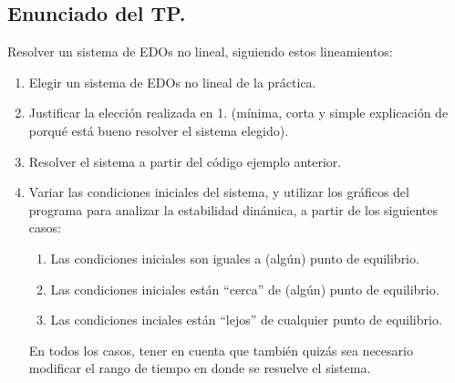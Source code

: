 \documentclass[a4paper,11pt,landscape,twocolumn]{article}
\begin{document}
\subsection*{Enunciado del TP.}
Resolver un sistema de EDOs no lineal, siguiendo estos lineamientos:
	\begin{enumerate}
		\item Elegir un sistema de EDOs no lineal de la práctica.
		\item Justificar la elección realizada en 1. (mínima, corta y simple explicación de porqué está bueno resolver el sistema elegido).
		\item Resolver el sistema a partir del código ejemplo anterior.
		\item Variar las condiciones iniciales del sistema, y utilizar los gráficos del programa para analizar la estabilidad dinámica, a partir de los siguientes casos:
		\begin{enumerate}
			\item Las condiciones iniciales son iguales a (algún) punto de equilibrio.
			\item Las condiciones iniciales están ``cerca'' de (algún) punto de equilibrio.
			\item Las condiciones inciales están ``lejos'' de cualquier punto de equilibrio.
		\end{enumerate}
		En todos los casos, tener en cuenta que también quizás sea necesario modificar el rango de tiempo en donde se resuelve el sistema.
	\end{enumerate}
\end{document}
